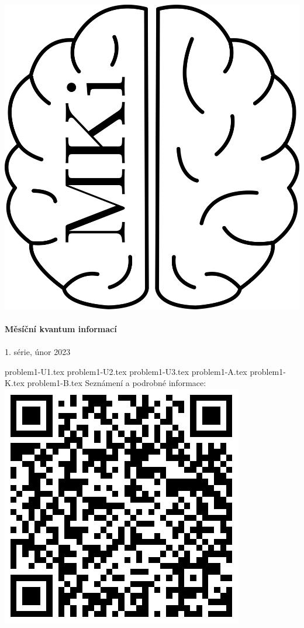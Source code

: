 \documentclass[12pt]{article}
\begin{document}
\thispagestyle{firststyle}
\vspace*{\fill}
\begin{center}
\includegraphics[scale=1]{../../../propagace/logo/mkilogo.png}\\
\quad\\
\textbf{\Huge{Měsíční kvantum informací}}\\
\quad\\
\LARGE{1. série, únor 2023}
\end{center}
\vspace*{\fill}

\newpage
{problem1-U1.tex}
\newpage
{problem1-U2.tex}
{problem1-U3.tex}
{problem1-A.tex}
{problem1-K.tex}
{problem1-B.tex}
\newpage
Seznámení a podrobné informace:\\
\includegraphics{../../../propagace/qrcodes/introduction.png}
\\
\end{document}
